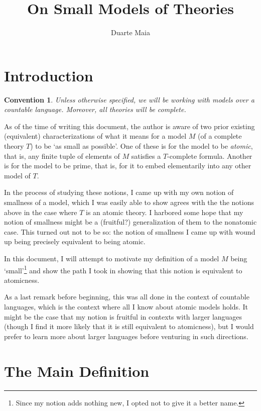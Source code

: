 \documentclass{article}
\title{On Small Models of Theories}
\author{Duarte Maia}
\theoremstyle{nonumberplain}
\newtheorem{convention}{Convention}
\begin{document}
\maketitle

\tableofcontents

\section{Introduction}

\begin{convention}
Unless otherwise specified, we will be working with models over a countable language. Moreover, all theories will be complete.
\end{convention}

As of the time of writing this document, the author is aware of two prior existing (equivalent) characterizations of what it means for a model $M$ (of a complete theory $T$) to be `as small as possible'. One of these is for the model to be \emph{atomic}, that is, any finite tuple of elements of $M$ satisfies a $T$-complete formula. Another is for the model to be prime, that is, for it to embed elementarily into any other model of $T$.

In the process of studying these notions, I came up with my own notion of smallness of a model, which I was easily able to show agrees with the the notions above in the case where $T$ is an atomic theory. I harbored some hope that my notion of smallness might be a (fruitful?) generalization of them to the nonatomic case. This turned out not to be so: the notion of smallness I came up with wound up being precisely equivalent to being atomic.

In this document, I will attempt to motivate my definition of a model $M$ being `small'\footnote{Since my notion adds nothing new, I opted not to give it a better name.} and show the path I took in showing that this notion is equivalent to atomicness.

As a last remark before beginning, this was all done in the context of countable languages, which is the context where all I know about atomic models holds. It might be the case that my notion is fruitful in contexts with larger languages (though I find it more likely that it is still equivalent to atomicness), but I would prefer to learn more about larger languages before venturing in such directions.

\section{The Main Definition}
\end{document}
